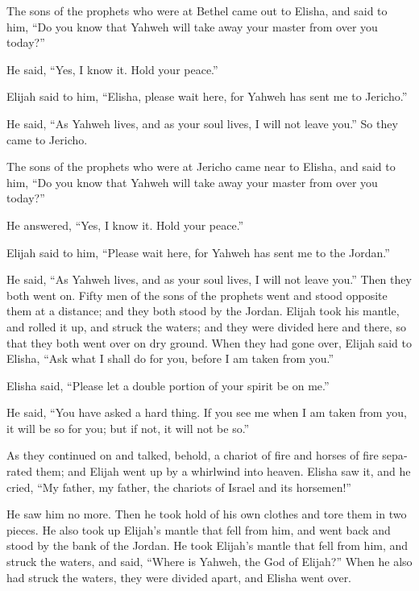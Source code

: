 \begin{paracol}{2}
\begin{otherlanguage}{english}
 The sons of the prophets who were at Bethel came out to
Elisha, and said to him, ``Do you know that Yahweh will take away your
master from over you today?''

He said, ``Yes, I know it. Hold your peace.''

 Elijah said to him, ``Elisha, please wait here, for
Yahweh has sent me to Jericho.''

He said, ``As Yahweh lives, and as your soul lives, I will not leave
you.'' So they came to Jericho.

 The sons of the prophets who were at Jericho came near to
Elisha, and said to him, ``Do you know that Yahweh will take away your
master from over you today?''

He answered, ``Yes, I know it. Hold your peace.''

 Elijah said to him, ``Please wait here, for Yahweh has
sent me to the Jordan.''

He said, ``As Yahweh lives, and as your soul lives, I will not leave
you.'' Then they both went on.  Fifty men of the sons of
the prophets went and stood opposite them at a distance; and they both
stood by the Jordan.  Elijah took his mantle, and rolled
it up, and struck the waters; and they were divided here and there, so
that they both went over on dry ground.  When they had
gone over, Elijah said to Elisha, ``Ask what I shall do for you, before
I am taken from you.''

Elisha said, ``Please let a double portion of your spirit be on me.''

 He said, ``You have asked a hard thing. If you see me
when I am taken from you, it will be so for you; but if not, it will not
be so.''

 As they continued on and talked, behold, a chariot of
fire and horses of fire separated them; and Elijah went up by a
whirlwind into heaven.  Elisha saw it, and he cried, ``My
father, my father, the chariots of Israel and its horsemen!''

He saw him no more. Then he took hold of his own clothes and tore them
in two pieces.  He also took up Elijah's mantle that fell
from him, and went back and stood by the bank of the Jordan.
 He took Elijah's mantle that fell from him, and struck
the waters, and said, ``Where is Yahweh, the God of Elijah?'' When he
also had struck the waters, they were divided apart, and Elisha went
over.


\end{otherlanguage}
\end{paracol}
